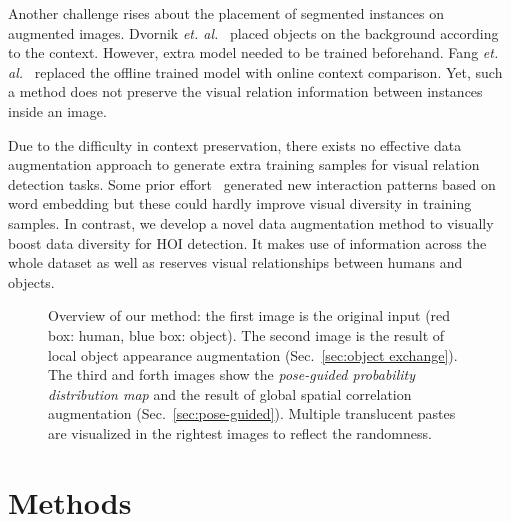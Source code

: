 \documentclass[10pt,twocolumn,letterpaper]{article}
\begin{document}
Another challenge rises about the placement of segmented instances on augmented images. Dvornik \textit{et. al.}~\cite{dvornik2018modeling} placed objects on the background according to the context. However, extra model needed to be trained beforehand. Fang \textit{et. al.}~\cite{fang2019instaboost} replaced the offline trained model with online context comparison. Yet, such a method does not preserve the visual relation information between instances inside an image.

Due to the difficulty in context preservation, there exists no effective data augmentation approach to generate extra training samples for visual relation detection tasks. Some prior effort~\cite{bansal2019detecting,hou2020visual} generated new interaction patterns based on word embedding but these could hardly improve visual diversity in training samples. In contrast, we develop a novel data augmentation method to visually boost data diversity for HOI detection. It makes use of information across the whole dataset as well as reserves visual relationships between humans and objects.

\begin{figure*}[htb!]
\centering


\caption{Overview of our method: the first image is the original input (red box: human, blue box: object). The second image is the result of local object appearance augmentation (Sec.~\ref{sec:object exchange}). The third and forth images show the \textit{pose-guided probability distribution map} and the result of global spatial correlation augmentation (Sec.~\ref{sec:pose-guided}). Multiple translucent pastes are visualized in the rightest images to reflect the randomness.}
\label{fig:overview}
\end{figure*}

\section{Methods}
\end{document}
